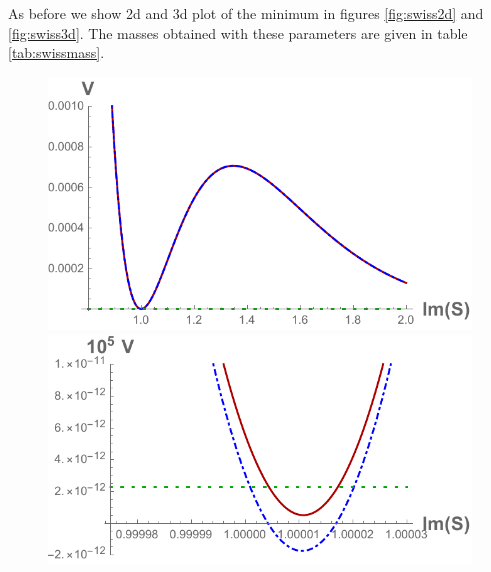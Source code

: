 \documentclass[a4paper,12pt,twoside,openright]{report}
\begin{document}
As before we show 2d and 3d plot of the minimum in figures \ref{fig:swiss2d} and \ref{fig:swiss3d}. The masses obtained with these parameters are given in table \ref{tab:swissmass}.

\begin{figure}[H]
\centering
\includegraphics[scale=0.55]{quevedo_38_S_large.pdf}\qquad\includegraphics[scale=0.59]{quevedo_38_S_close.pdf}\\

\end{figure}
\end{document}
